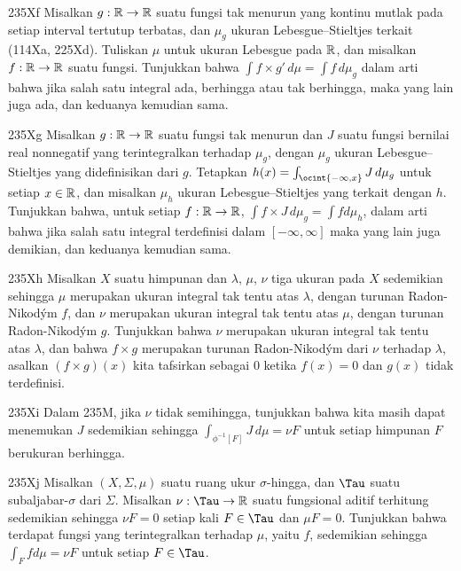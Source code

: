 {\sqheader 235Xf Misalkan $g:\Bbb R\to\Bbb R$ suatu fungsi
tak menurun yang kontinu mutlak pada setiap interval tertutup terbatas,
dan $\mu_g$ ukuran Lebesgue--Stieltjes terkait (114Xa, 225Xd). Tuliskan
$\mu$ untuk ukuran Lebesgue pada $\Bbb R$, dan misalkan
$f:\Bbb R\to\Bbb R$ suatu fungsi. Tunjukkan bahwa
$\int f\times g'\,d\mu=\int f\,d\mu_g$ dalam arti bahwa jika salah satu
integral ada, berhingga atau tak berhingga, maka yang lain juga ada,
dan keduanya kemudian sama.

\spheader 235Xg Misalkan $g:\Bbb R\to\Bbb R$ suatu fungsi
tak menurun dan $J$ suatu fungsi bernilai real nonnegatif yang
terintegralkan terhadap $\mu_g$, dengan $\mu_g$ ukuran
Lebesgue--Stieltjes yang didefinisikan dari $g$. Tetapkan
$h(x)=\int_{\ocint{-\infty,x}}J\,d\mu_g$ untuk setiap $x\in\Bbb R$,
dan misalkan $\mu_h$ ukuran Lebesgue--Stieltjes yang terkait dengan
$h$. Tunjukkan bahwa, untuk setiap $f:\Bbb R\to\Bbb R$,
$\int f\times J\,d\mu_g=\int fd\mu_h$, dalam arti bahwa jika salah satu
integral terdefinisi dalam $[-\infty,\infty]$ maka yang lain juga
demikian, dan keduanya kemudian sama.

\sqheader 235Xh Misalkan $X$ suatu himpunan dan $\lambda$, $\mu$,
$\nu$ tiga ukuran pada $X$ sedemikian sehingga $\mu$ merupakan ukuran
integral tak tentu atas $\lambda$, dengan turunan Radon-Nikod\'ym $f$,
dan $\nu$ merupakan ukuran integral tak tentu atas $\mu$, dengan
turunan Radon-Nikod\'ym $g$. Tunjukkan bahwa $\nu$ merupakan ukuran
integral tak tentu atas $\lambda$, dan bahwa $f\times g$ merupakan
turunan Radon-Nikod\'ym dari $\nu$ terhadap $\lambda$, asalkan
$(f\times g)(x)$ kita tafsirkan sebagai $0$ ketika $f(x)=0$ dan $g(x)$
tidak terdefinisi.

\spheader 235Xi Dalam 235M, jika $\nu$ tidak semihingga, tunjukkan
bahwa kita masih dapat menemukan $J$ sedemikian sehingga
$\int_{\phi^{-1}[F]}J\,d\mu=\nu F$ untuk setiap himpunan $F$ berukuran
berhingga. 

\spheader 235Xj Misalkan $(X,\Sigma,\mu)$ suatu ruang ukur
$\sigma$-hingga, dan $\Tau$ suatu subaljabar-$\sigma$ dari $\Sigma$.
Misalkan $\nu:\Tau\to\Bbb R$ suatu fungsional aditif terhitung
sedemikian sehingga $\nu F=0$ setiap kali $F\in\Tau$ dan $\mu F=0$.
Tunjukkan bahwa terdapat fungsi yang terintegralkan terhadap $\mu$, yaitu
$f$, sedemikian sehingga $\int_Ffd\mu=\nu F$ untuk setiap $F\in\Tau$.

}

